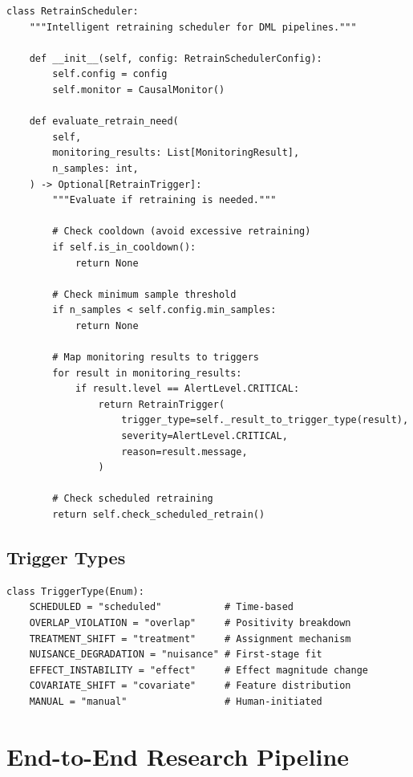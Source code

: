 \begin{verbatim}
class RetrainScheduler:
    """Intelligent retraining scheduler for DML pipelines."""

    def __init__(self, config: RetrainSchedulerConfig):
        self.config = config
        self.monitor = CausalMonitor()

    def evaluate_retrain_need(
        self,
        monitoring_results: List[MonitoringResult],
        n_samples: int,
    ) -> Optional[RetrainTrigger]:
        """Evaluate if retraining is needed."""

        # Check cooldown (avoid excessive retraining)
        if self.is_in_cooldown():
            return None

        # Check minimum sample threshold
        if n_samples < self.config.min_samples:
            return None

        # Map monitoring results to triggers
        for result in monitoring_results:
            if result.level == AlertLevel.CRITICAL:
                return RetrainTrigger(
                    trigger_type=self._result_to_trigger_type(result),
                    severity=AlertLevel.CRITICAL,
                    reason=result.message,
                )

        # Check scheduled retraining
        return self.check_scheduled_retrain()
\end{verbatim}

\subsection{Trigger Types}

\begin{verbatim}
class TriggerType(Enum):
    SCHEDULED = "scheduled"           # Time-based
    OVERLAP_VIOLATION = "overlap"     # Positivity breakdown
    TREATMENT_SHIFT = "treatment"     # Assignment mechanism
    NUISANCE_DEGRADATION = "nuisance" # First-stage fit
    EFFECT_INSTABILITY = "effect"     # Effect magnitude change
    COVARIATE_SHIFT = "covariate"     # Feature distribution
    MANUAL = "manual"                 # Human-initiated
\end{verbatim}


\section{End-to-End Research Pipeline}\label{sec:production_pipeline}

